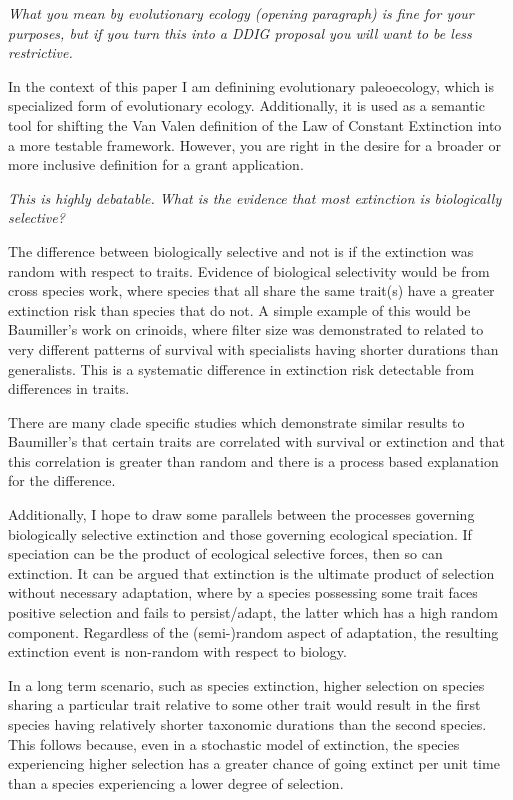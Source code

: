\documentclass{article}
\begin{document}
\textit{What you mean by evolutionary ecology (opening paragraph) is fine for your purposes, but if you turn this into a DDIG proposal you will want to be less restrictive.}

In the context of this paper I am definining evolutionary paleoecology, which is specialized form of evolutionary ecology. Additionally, it is used as a semantic tool for shifting the Van Valen definition of the Law of Constant Extinction into a more testable framework. However, you are right in the desire for a broader or more inclusive definition for a grant application.


\textit{This is highly debatable.  What is the evidence that most extinction is biologically selective?}

The difference between biologically selective and not is if the extinction was random with respect to traits. Evidence of biological selectivity would be from cross species work, where species that all share the same trait(s) have a greater extinction risk than species that do not. A simple example of this would be Baumiller's work on crinoids, where filter size was demonstrated to related to very different patterns of survival with specialists having shorter durations than generalists. This is a systematic difference in extinction risk detectable from differences in traits.

There are many clade specific studies which demonstrate similar results to Baumiller's that certain traits are correlated with survival or extinction and that this correlation is greater than random and there is a process based explanation for the difference. 

Additionally, I hope to draw some parallels between the processes governing biologically selective extinction and those governing ecological speciation. If speciation can be the product of ecological selective forces, then so can extinction. It can be argued that extinction is the ultimate product of selection without necessary adaptation, where by a species possessing some trait faces positive selection and fails to persist/adapt, the latter which has a high random component. Regardless of the (semi-)random aspect of adaptation, the resulting extinction event is non-random with respect to biology.

In a long term scenario, such as species extinction, higher selection on species sharing a particular trait relative to some other trait would result in the first species having relatively shorter taxonomic durations than the second species. This follows because, even in a stochastic model of extinction, the species experiencing higher selection has a greater chance of going extinct per unit time than a species experiencing a lower degree of selection.
\end{document}
